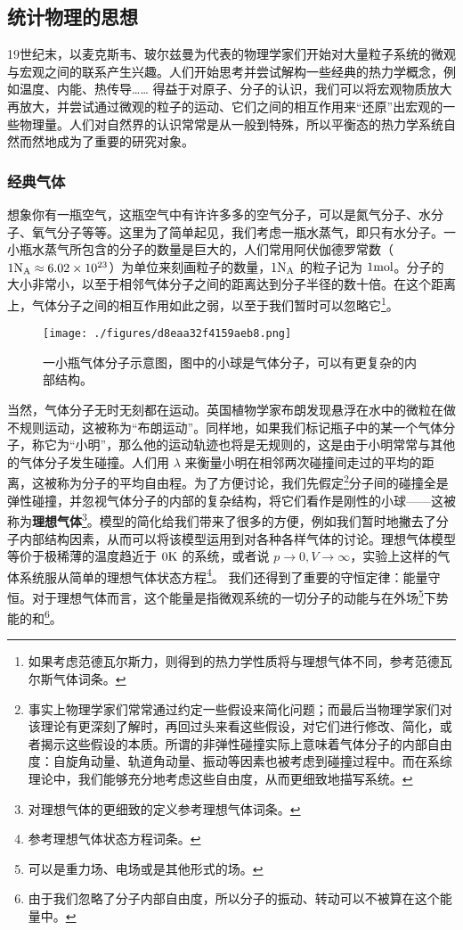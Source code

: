 \subsection{统计物理的思想}
19世纪末，以麦克斯韦、玻尔兹曼为代表的物理学家们开始对大量粒子系统的微观与宏观之间的联系产生兴趣。人们开始思考并尝试解构一些经典的热力学概念，例如温度、内能、热传导…… 得益于对原子、分子的认识，我们可以将宏观物质放大再放大，并尝试通过微观的粒子的运动、它们之间的相互作用来“还原”出宏观的一些物理量。人们对自然界的认识常常是从一般到特殊，所以平衡态的热力学系统自然而然地成为了重要的研究对象。
\subsubsection{经典气体}
想象你有一瓶空气，这瓶空气中有许许多多的空气分子，可以是氮气分子、水分子、氧气分子等等。这里为了简单起见，我们考虑一瓶水蒸气，即只有水分子。一小瓶水蒸气所包含的分子的数量是巨大的，人们常用阿伏伽德罗常数（$1 {\rm N_A}\approx 6.02\times 10^{23}$）为单位来刻画粒子的数量，$1 {\rm N_A}$ 的粒子记为 $1 {\rm mol}$。分子的大小非常小，以至于相邻气体分子之间的距离达到分子半径的数十倍。在这个距离上，气体分子之间的相互作用如此之弱，以至于我们暂时可以忽略它\footnote{如果考虑范德瓦尔斯力，则得到的热力学性质将与理想气体不同，参考范德瓦尔斯气体词条。}。

\begin{figure}[ht]
\centering
\texttt{[image: ./figures/d8eaa32f4159aeb8.png]}
\caption{一小瓶气体分子示意图，图中的小球是气体分子，可以有更复杂的内部结构。} \label{fig_statsc_1}
\end{figure}
当然，气体分子无时无刻都在运动。英国植物学家布朗发现悬浮在水中的微粒在做不规则运动，这被称为“布朗运动”。同样地，如果我们标记瓶子中的某一个气体分子，称它为“小明”，那么他的运动轨迹也将是无规则的，这是由于小明常常与其他的气体分子发生碰撞。人们用 $\lambda$ 来衡量小明在相邻两次碰撞间走过的平均的距离，这被称为分子的平均自由程。为了方便讨论，我们先假定\footnote{事实上物理学家们常常通过约定一些假设来简化问题；而最后当物理学家们对该理论有更深刻了解时，再回过头来看这些假设，对它们进行修改、简化，或者揭示这些假设的本质。所谓的非弹性碰撞实际上意味着气体分子的内部自由度：自旋角动量、轨道角动量、振动等因素也被考虑到碰撞过程中。而在系综理论中，我们能够充分地考虑这些自由度，从而更细致地描写系统。}分子间的碰撞全是弹性碰撞，并忽视气体分子的内部的复杂结构，将它们看作是刚性的小球——这被称为\textbf{理想气体}\footnote{对理想气体的更细致的定义参考理想气体词条。}。模型的简化给我们带来了很多的方便，例如我们暂时地撇去了分子内部结构因素，从而可以将该模型运用到对各种各样气体的讨论。理想气体模型等价于极稀薄的温度趋近于 $0 \rm K$ 的系统，或者说 $p\rightarrow 0,V\rightarrow \infty$，实验上这样的气体系统服从简单的理想气体状态方程\footnote{参考理想气体状态方程词条。}。
我们还得到了重要的守恒定律：能量守恒。对于理想气体而言，这个能量是指微观系统的一切分子的动能与在外场\footnote{可以是重力场、电场或是其他形式的场。}下势能的和\footnote{由于我们忽略了分子内部自由度，所以分子的振动、转动可以不被算在这个能量中。}。

